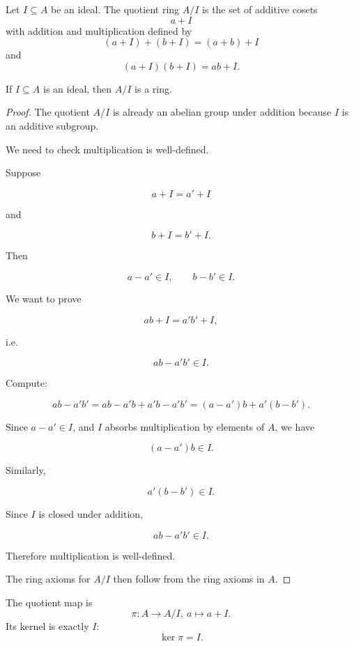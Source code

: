 \begin{defn}
    Let $I \subseteq A$ be an ideal. The quotient ring 
    $A/I$ is the set of additive cosets 
    \[
        a + I
    \]
    with addition and multiplication defined by 
    \[
        (a+I) + (b+I) = (a+b) + I
    \]
    and 
    \[
        (a+I)(b+I) = ab + I. 
    \]
\end{defn}
\begin{prop}
    If $I \subseteq A$ is an ideal, then $A/I$ is a ring. 
\end{prop}
\begin{proof}
    The quotient $A/I$ is already an abelian group under addition because $I$ is an additive subgroup.

    We need to check multiplication is well-defined.

    Suppose

    $$a+I=a'+I$$

    and

    $$b+I=b'+I.$$

    Then

    $$a-a'\in I,\qquad b-b'\in I.$$

    We want to prove

    $$ab+I=a'b'+I,$$

    i.e.

    $$ab-a'b'\in I.$$

    Compute:

    $$ab-a'b'=ab-a'b+a'b-a'b'=(a-a')b+a'(b-b').$$

    Since $a-a'\in I$, and $I$ absorbs multiplication by elements of $A$, we have

    $$(a-a')b\in I.$$

    Similarly,

    $$a'(b-b')\in I.$$

    Since $I$ is closed under addition,

    $$ab-a'b'\in I.$$

    Therefore multiplication is well-defined.

    The ring axioms for $A/I$ then follow from the ring axioms in $A$.
\end{proof}
The quotient map is 
\[
    \pi : A \to A/I, \ a \mapsto a + I.
\]
Its kernel is exactly $I$: 
\[
    \ker \pi = I. 
\]

